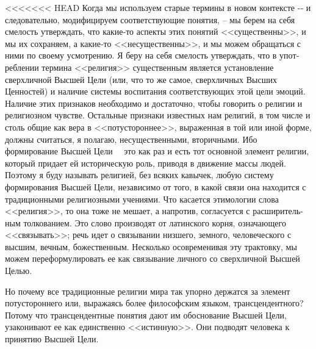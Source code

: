 \documentclass{book}
\begin{document}
<<<<<<< HEAD
Когда мы используем старые термины в новом контексте -‑ и следовательно, модифицируем соответствующие понятия, -- мы берем на себя смелость утверждать, что какие‑то аспекты этих понятий <<существенны>>, и мы их сохраняем, а какие‑то <<несущественны>>, и мы можем обращаться с ними по своему усмотрению. Я беру на себя смелость утверждать, что в упот­реблении термина <<религия>> существенным является установ­ление сверхличной Высшей Цели (или, что то же самое, сверх­личных Высших Ценностей) и наличие системы воспитания соответствующих этой цели эмоций. Наличие этих признаков необходимо и достаточно, чтобы говорить о религии и рели­гиозном чувстве. Остальные признаки известных нам религий, в том числе и столь общие как вера в <<потустороннее>>, выра­женная в той или иной форме, должны считаться, я полагаю, несущественными, вторичными. Ибо формирование Высшей Цели   это как раз и есть тот основной элемент религии, кото­рый придает ей историческую роль, приводя в движение массы людей. Поэтому я буду называть религией, без всяких кавычек, любую систему формирования Высшей Цели, независимо от то­го, в какой связи она находится с традиционными религиоз­ными учениями. Что касается этимологии слова <<религия>>, то она тоже не мешает, а напротив, согласуется с расширитель­ным толкованием. Это слово производят от латинского корня, означающего <<связывать>>; речь идет о связывании низшего, земного, человеческого с высшим, вечным, божественным. Не­сколько осовременивая эту трактовку, мы можем переформу­лировать ее как связывание личного со сверхличной Высшей Целью.

Но почему все традиционные религии мира так упорно держатся за элемент потустороннего или, выражаясь более философским языком, трансцендентного? Потому что трансцендентные понятия дают им обоснование Высшей Цели, узаконивают ее как единственно <<истинную>>. Они подводят человека к принятию Высшей Цели.
\end{document}
